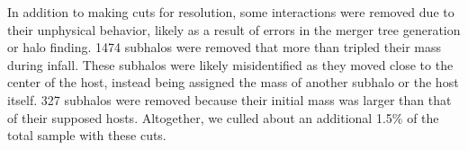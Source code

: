 \documentclass[fleqn,usenatbib]{mnras}
\begin{document}
In addition to making cuts for resolution, some interactions were removed due to their unphysical behavior, likely as a result of errors in the merger tree generation or halo finding. 1474 subhalos were removed that more than tripled their mass during infall. These subhalos were likely misidentified as they moved close to the center of the host, instead being assigned the mass of another subhalo or the host itself. 327 subhalos were removed because their initial mass was larger than that of their supposed hosts. Altogether, we culled about an additional 1.5\% of the total sample with these cuts.

\end{document}
